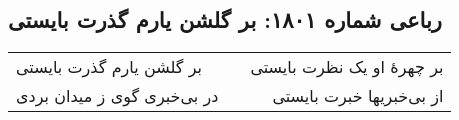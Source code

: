 \begin{center}
\section*{رباعی شماره ۱۸۰۱: بر گلشن یارم گذرت بایستی}
\label{sec:1801}
\begin{longtable}{l p{0.5cm} r}
بر گلشن یارم گذرت بایستی
&&
بر چهرهٔ او یک نظرت بایستی
\\
در بی‌خبری گوی ز میدان بردی
&&
از بی‌خبریها خبرت بایستی
\\
\end{longtable}
\end{center}
